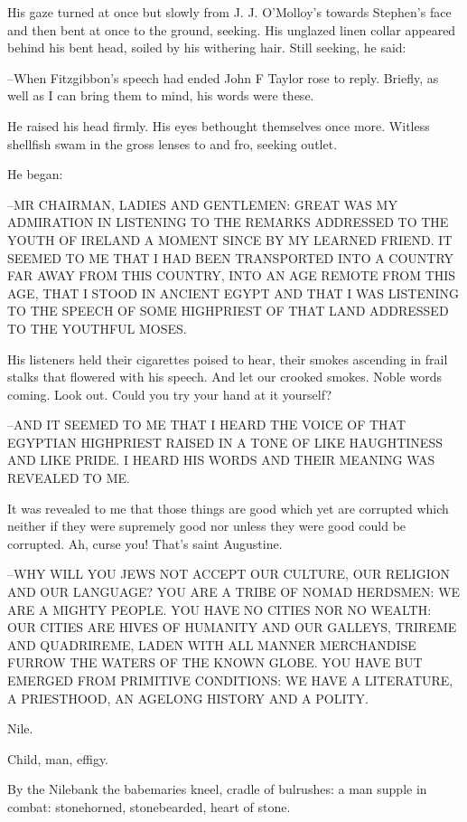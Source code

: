 His gaze turned at once but slowly from J. J. O'Molloy's towards
Stephen's face and then bent at once to the ground, seeking. His unglazed
linen collar appeared behind his bent head, soiled by his withering hair.
Still seeking, he said:

--When Fitzgibbon's speech had ended John F Taylor rose to reply.
Briefly, as well as I can bring them to mind, his words were these.

He raised his head firmly. His eyes bethought themselves once more.
Witless shellfish swam in the gross lenses to and fro, seeking outlet.

He began:

--MR CHAIRMAN, LADIES AND GENTLEMEN: GREAT WAS MY ADMIRATION IN LISTENING
TO THE REMARKS ADDRESSED TO THE YOUTH OF IRELAND A MOMENT SINCE BY MY
LEARNED FRIEND. IT SEEMED TO ME THAT I HAD BEEN TRANSPORTED INTO A COUNTRY
FAR AWAY FROM THIS COUNTRY, INTO AN AGE REMOTE FROM THIS AGE, THAT I STOOD
IN ANCIENT EGYPT AND THAT I WAS LISTENING TO THE SPEECH OF SOME HIGHPRIEST
OF THAT LAND ADDRESSED TO THE YOUTHFUL MOSES.

His listeners held their cigarettes poised to hear, their smokes
ascending in frail stalks that flowered with his speech. And let our
crooked smokes. Noble words coming. Look out. Could you try your hand at
it yourself?

--AND IT SEEMED TO ME THAT I HEARD THE VOICE OF THAT EGYPTIAN HIGHPRIEST
RAISED IN A TONE OF LIKE HAUGHTINESS AND LIKE PRIDE. I HEARD HIS WORDS AND
THEIR MEANING WAS REVEALED TO ME.



It was revealed to me that those things are good which yet are
corrupted which neither if they were supremely good nor unless they were
good could be corrupted. Ah, curse you! That's saint Augustine.

--WHY WILL YOU JEWS NOT ACCEPT OUR CULTURE, OUR RELIGION AND OUR
LANGUAGE? YOU ARE A TRIBE OF NOMAD HERDSMEN: WE ARE A MIGHTY PEOPLE. YOU
HAVE NO CITIES NOR NO WEALTH: OUR CITIES ARE HIVES OF HUMANITY AND OUR
GALLEYS, TRIREME AND  QUADRIREME, LADEN WITH ALL MANNER MERCHANDISE FURROW
THE WATERS OF THE KNOWN GLOBE. YOU HAVE BUT EMERGED FROM PRIMITIVE
CONDITIONS: WE HAVE A LITERATURE, A PRIESTHOOD, AN AGELONG HISTORY AND A
POLITY.

Nile.

Child, man, effigy.

By the Nilebank the babemaries kneel, cradle of bulrushes: a man
supple in combat: stonehorned, stonebearded, heart of stone.

